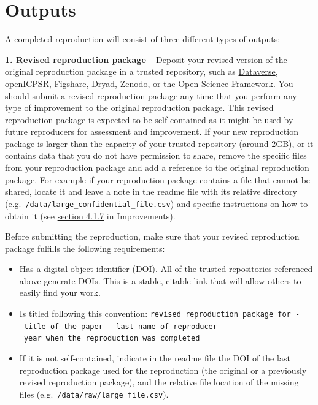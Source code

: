 \documentclass[
  openany]{book}
\providecommand{\tightlist}{%
  \setlength{\itemsep}{0pt}\setlength{\parskip}{0pt}}
\begin{document}
\hypertarget{outputs}{%
\section{Outputs}\label{outputs}}

A completed reproduction will consist of three different types of outputs:

\textbf{1. Revised reproduction package} -- Deposit your revised version of the original reproduction package in a trusted repository, such as \href{https://dataverse.org/}{Dataverse}, \href{https://www.openicpsr.org/openicpsr/}{openICPSR}, \href{https://figshare.com}{Figshare}, \href{https://datadryad.org/stash}{Dryad}, \href{https://about.zenodo.org/}{Zenodo}, or the \href{osf.io/}{Open Science Framework}. You should submit a revised reproduction package any time that you perform any type of \protect\hyperlink{improvements}{improvement} to the original reproduction package. This revised reproduction package is expected to be self-contained as it might be used by future reproducers for assessment and improvement. If your new reproduction package is larger than the capacity of your trusted repository (around 2GB), or it contains data that you do not have permission to share, remove the specific files from your reproduction package and add a reference to the original reproduction package. For example if your reproduction package contains a file that cannot be shared, locate it and leave a note in the readme file with its relative directory (e.g.~\texttt{/data/large\_confidential\_file.csv}) and specific instructions on how to obtain it (see \protect\hyperlink{adding-info-admin}{section 4.1.7} in Improvements).

Before submitting the reproduction, make sure that your revised reproduction package fulfills the following requirements:

\begin{itemize}
\tightlist
\item
  Has a digital object identifier (DOI). All of the trusted repositories referenced above generate DOIs. This is a stable, citable link that will allow others to easily find your work.
\item
  Is titled following this convention: \texttt{revised\ reproduction\ package\ for\ -\ title\ of\ the\ paper\ -\ last\ name\ of\ reproducer\ -\ year\ when\ the\ reproduction\ was\ completed}
\item
  If it is not self-contained, indicate in the readme file the DOI of the last reproduction package used for the reproduction (the original or a previously revised reproduction package), and the relative file location of the missing files (e.g.~\texttt{/data/raw/large\_file.csv}).
\end{itemize}
\end{document}
